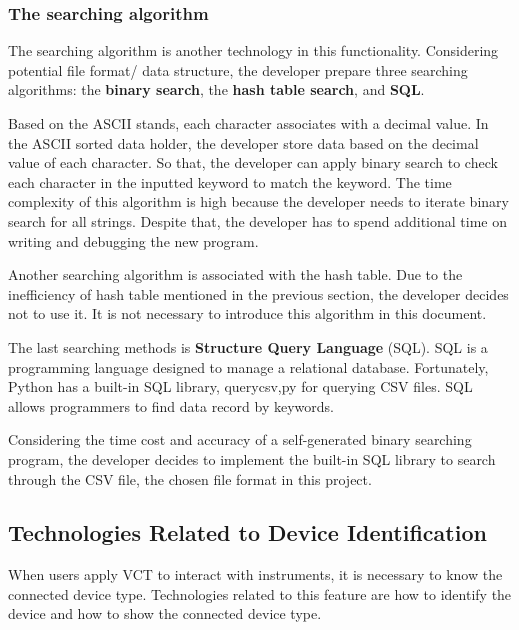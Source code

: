 \documentclass [10pt]{article}
\begin{document}
\subsubsection{The searching algorithm}
The searching algorithm is another technology in this functionality. Considering potential file format/ data structure, the developer prepare three searching algorithms: the \textbf{binary search}, the \textbf{hash table search}, and \textbf{SQL}. \par
Based on the ASCII stands, each character associates with a decimal value. In the ASCII sorted data holder, the developer store data based on the decimal value of each character. So that, the developer can apply binary search to check each character in the inputted keyword to match the keyword. The time complexity of this algorithm is high because the developer needs to iterate binary search for all strings. Despite that, the developer has to spend additional time on writing and debugging the new program.       \par 
Another searching algorithm is associated with the hash table. Due to the inefficiency of hash table mentioned in the previous section, the developer decides not to use it. It is not necessary to introduce this algorithm in this document. \par
The last searching methods is \textbf{Structure Query Language} (SQL). SQL is a  programming language designed to manage a relational database. Fortunately, Python has a built-in SQL library, querycsv,py for querying CSV files. SQL allows programmers to find data record by keywords. \par
Considering the time cost and accuracy of a self-generated binary searching program, the developer decides to implement the built-in SQL library to search through the CSV file, the chosen file format in this project. 


\subsection{Technologies Related to Device Identification}
When users apply VCT to interact with instruments, it is necessary to know the connected device type. Technologies related to this feature are how to identify the device and how to show the connected device type.  
\end{document}
